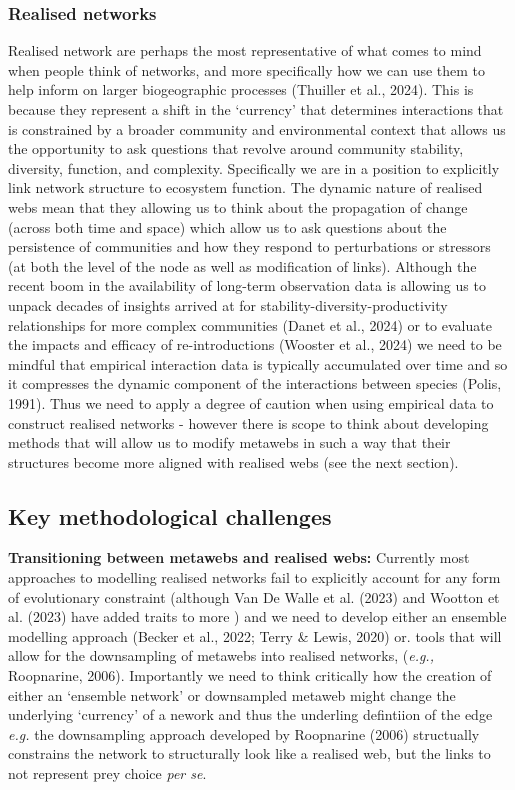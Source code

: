 \documentclass[
]{article}
\begin{document}
\subsubsection{Realised networks}\label{realised-networks}

Realised network are perhaps the most representative of what comes to
mind when people think of networks, and more specifically how we can use
them to help inform on larger biogeographic processes (Thuiller et al.,
2024). This is because they represent a shift in the `currency' that
determines interactions that is constrained by a broader community and
environmental context that allows us the opportunity to ask questions
that revolve around community stability, diversity, function, and
complexity. Specifically we are in a position to explicitly link network
structure to ecosystem function. The dynamic nature of realised webs
mean that they allowing us to think about the propagation of change
(across both time and space) which allow us to ask questions about the
persistence of communities and how they respond to perturbations or
stressors (at both the level of the node as well as modification of
links). Although the recent boom in the availability of long-term
observation data is allowing us to unpack decades of insights arrived at
for stability-diversity-productivity relationships for more complex
communities (Danet et al., 2024) or to evaluate the impacts and efficacy
of re-introductions (Wooster et al., 2024) we need to be mindful that
empirical interaction data is typically accumulated over time and so it
compresses the dynamic component of the interactions between species
(Polis, 1991). Thus we need to apply a degree of caution when using
empirical data to construct realised networks - however there is scope
to think about developing methods that will allow us to modify metawebs
in such a way that their structures become more aligned with realised
webs (see the next section).

\subsection{Key methodological
challenges}\label{key-methodological-challenges}

\textbf{Transitioning between metawebs and realised webs:} Currently
most approaches to modelling realised networks fail to explicitly
account for any form of evolutionary constraint (although Van De Walle
et al. (2023) and Wootton et al. (2023) have added traits to more ) and
we need to develop either an ensemble modelling approach (Becker et al.,
2022; Terry \& Lewis, 2020) or. tools that will allow for the
downsampling of metawebs into realised networks, (\emph{e.g.,}
Roopnarine, 2006). Importantly we need to think critically how the
creation of either an `ensemble network' or downsampled metaweb might
change the underlying `currency' of a nework and thus the underling
defintiion of the edge \emph{e.g.} the downsampling approach developed
by Roopnarine (2006) structually constrains the network to structurally
look like a realised web, but the links to not represent prey choice
\emph{per se}.
\end{document}
